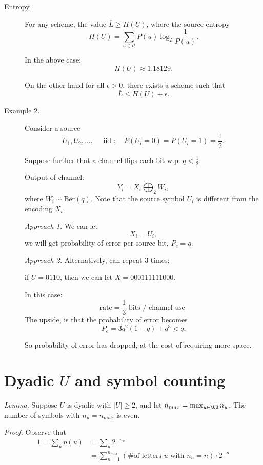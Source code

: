 \begin{description}
  \item[Entropy.] For any scheme, the value $\overline{L} \geq H(U)$, where the source entropy
    \[
      H(U) = \sum_{u \in \mathcal{U}} P(u) \log_2 \frac{1}{P(u)}.
    \]

    In the above case:
    \[
    H(U) \approx 1.18129.
    \]

    On the other hand for all $\epsilon > 0$, there exists a scheme such that
    \[
      \overline{L} \leq H(U) + \epsilon.
    \]

  \item[Example 2.] Consider a source
    \[
      U_1, U_2, \dots, \quad \text{ iid }; \quad P(U_i = 0) = P(U_i = 1) = \frac{1}{2}.
    \]

    Suppose further that a channel flips each bit w.p. $q < \frac{1}{2}$.

    Output of channel:
    \[
      Y_i = X_i \bigoplus_2 W_i,
    \]
    where $W_i \sim \text{Ber}(q)$.  Note that the source symbol $U_i$ is different from the encoding $X_i$.

    {\it Approach 1.} We can let
    \[
      X_i = U_i,
    \]
    we will get probability of error per source bit, $P_e = q$.

    {\it Approach 2.} Alternatively, can repeat $3$ times:

    if $U = 0 1 1 0$, then we can let $X = 000 111 111 000$.

    In this case:
    \[
      \text{rate} = \frac{1}{3} \text{ bits / channel use }
    \]
    The upside, is that the probability of error becomes
    \[
      P_e = 3 q^2 (1-q) + q^3 < q.
    \]

    So probability of error has dropped, at the cost of requiring more space.

\end{description}

\section{Dyadic $U$ and symbol counting}

{\it Lemma.} Suppose $U$ is dyadic with $|U| \geq 2$, and let $n_{max} = \max_{u \in \UU} n_u$.  The number of symbols with $n_u = n_{max}$ is even.

{\it Proof.} Observe that
\begin{align*}
  1 = \sum_{u} p(u) &= \sum_{u} 2^{-n_u} \\
  &= \sum_{n=1}^{n_{max}} (\text{\# of letters $u$ with $n_u = n$}) \cdot 2^{-n}  \\
\end{align*}

